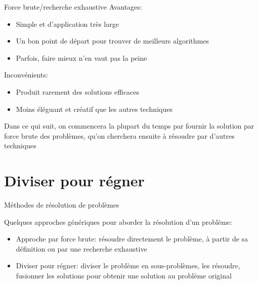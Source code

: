 \begin{frame}{Force brute/recherche exhaustive}
Avantages:
\begin{itemize}
\item Simple et d'application très large
\item Un bon point de départ pour trouver de meilleurs algorithmes
\item Parfois, faire mieux n'en vaut pas la peine
\end{itemize}

\bigskip

Inconvénients:
\begin{itemize}
\item Produit rarement des solutions efficaces
\item Moins éléguant et créatif que les autres techniques
\end{itemize}

\bigskip

Dans ce qui suit, on commencera la plupart du temps par fournir la solution par force brute des problèmes, qu'on cherchera ensuite à résoudre par d'autres techniques

\end{frame}


\section{Diviser pour régner}

\begin{frame}{Méthodes de résolution de problèmes}

Quelques approches génériques pour aborder la résolution d'un problème:
\begin{itemize}
\item \alert{Approche par force brute:} résoudre directement le problème, à partir de sa définition ou par une recherche exhaustive
\item \alert{Diviser pour régner:} diviser le problème en sous-problèmes, les résoudre, fusionner les solutions pour obtenir une solution au problème original
\end{itemize}

\end{frame}

